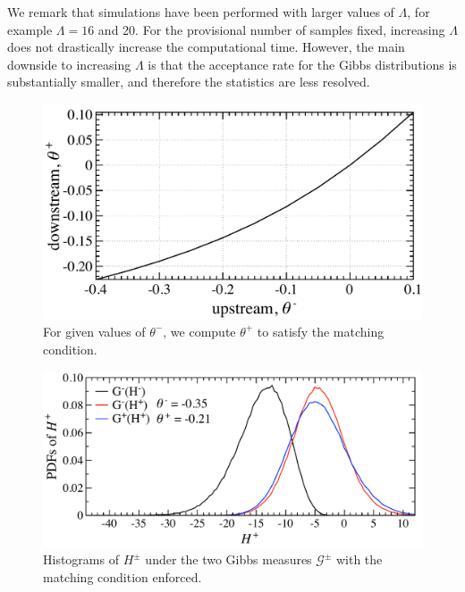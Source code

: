 \documentclass[12pt]{article}
\newcommand{\Gibbs}{\mathcal{G}}
\begin{document}
We remark that simulations have been performed with larger values of $\Lambda$, for example $\Lambda = 16$ and 20. For the provisional number of samples fixed, increasing $\Lambda$ does not drastically increase the computational time. However, the main downside to increasing $\Lambda$ is that the acceptance rate for the Gibbs distributions is substantially smaller, and therefore the statistics are less resolved.


\begin{figure}%
\begin{center}
\includegraphics[width = 0.55 \textwidth]{match_theta}
\caption{For given values of $\theta^-$, we compute $\theta^+$ to satisfy the matching condition.}
\label{match_theta}
\end{center}
\end{figure}
 
\begin{figure}%
\begin{center}
\includegraphics[width = 0.75 \textwidth]{matchH}
\caption{Histograms of $H^\pm$ under the two Gibbs measures $\Gibbs^{\pm}$ with the matching condition enforced.}
\label{matchH}
\end{center}
\end{figure}
 
\end{document}
